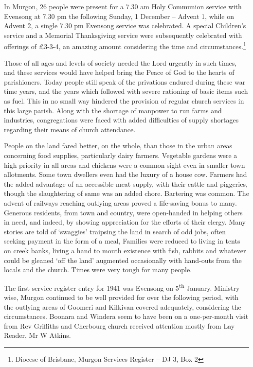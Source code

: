 In Murgon, 26 people were present for a 7.30 am Holy Communion service with Evensong at 7.30 pm the following Sunday, 1 December -- Advent 1, while on Advent 2, a single 7.30 pm Evensong service was celebrated. A special Children's service and a Memorial Thanksgiving service were subsequently celebrated with offerings of \pounds3-3-4, an amazing amount considering the time and circumstances.\footnote{Diocese of Brisbane, Murgon Services Register -- DJ 3, Box 2}


Those of all ages and levels of society needed the Lord urgently in such times, and these services would have helped bring the Peace of God to the hearts of parishioners. Today people still speak of the privations endured during these war time years, and the years which followed with severe rationing of basic items such as fuel. This in no small way hindered the provision of regular church services in this large parish. Along with the shortage of manpower to run farms and industries, congregations were faced with added difficulties of supply shortages regarding their means of church attendance.



People on the land fared better, on the whole, than those in the urban areas concerning food supplies, particularly dairy farmers. Vegetable gardens were a high priority in all areas and chickens were a common sight even in smaller town allotments. Some town dwellers even had the luxury of a house cow. Farmers had the added advantage of an accessible meat supply, with their cattle and piggeries, though the slaughtering of same was an added chore. Bartering was common. The advent of railways reaching outlying areas proved a life-saving bonus to many. Generous residents, from town and country, were open-handed in helping others in need, and indeed, by showing appreciation for the efforts of their clergy. Many stories are told of `swaggies' traipsing the land in search of odd jobs, often seeking payment in the form of a meal, Families were reduced to living in tents on creek banks, living a hand to mouth existence with fish, rabbits and whatever could be gleaned `off the land' augmented occasionally with hand-outs from the locals and the church. Times were very tough for many people.



The first service register entry for 1941 was Evensong on 5\textsuperscript{th} January. Ministry-wise, Murgon continued to be well provided for over the following period, with the outlying areas of Goomeri and Kilkivan covered adequately, considering the circumstances. Boonara and Windera seem to have been on a one-per-month visit from Rev Griffiths and Cherbourg church received attention mostly from Lay Reader, Mr W Atkins.




